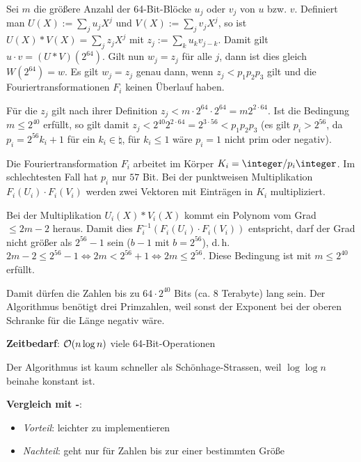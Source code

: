 \begin{Beweis}
    Sei $m$ die größere Anzahl der 64-Bit-Blöcke $u_j$ oder $v_j$ von $u$ bzw. $v$.
    Definiert man $U(X) := \sum_j u_j X^j$ und $V(X) := \sum_j v_j X^j$, so ist
    $U(X) \ast V(X) = \sum_j z_j X^j$ mit $z_j := \sum_k u_k v_{j-k}$.
    Damit gilt $u \cdot v = (U \ast V)(2^{64})$.
    Gilt nun $w_j = z_j$ für alle $j$, dann ist dies gleich $W(2^{64}) = w$.
    Es gilt $w_j = z_j$ genau dann, wenn $z_j < p_1 p_2 p_3$ gilt
    und die Fouriertransformationen $F_i$
    keinen Überlauf haben.

    Für die $z_j$ gilt nach ihrer Definition
    $z_j < m \cdot 2^{64} \cdot 2^{64} = m 2^{2 \cdot 64}$.
    Ist die Bedingung $m \le 2^{40}$ erfüllt, so gilt damit
    $z_j < 2^{40} 2^{2 \cdot 64} = 2^{3 \cdot 56} < p_1 p_2 p_3$
    (es gilt $p_i > 2^{56}$, da $p_i = 2^{56} k_i + 1$ für ein $k_i \in \natural$,
    für $k_i \le 1$ wäre $p_i = 1$ nicht prim oder negativ).

    Die Fouriertransformation $F_i$ arbeitet im Körper $K_i = \integer/p_i\integer$.
    Im schlechtesten Fall hat $p_i$ nur $57$ Bit.
    Bei der punktweisen Multiplikation $F_i(U_i) \cdot F_i(V_i)$ werden zwei Vektoren
    mit Einträgen in $K_i$ multipliziert.

    Bei der Multiplikation $U_i(X) \ast V_i(X)$ kommt ein Polynom vom Grad $\le 2m - 2$ heraus.
    Damit dies $F_i^{-1}(F_i(U_i) \cdot F_i(V_i))$ entspricht, darf der Grad nicht größer als
    $2^{56} - 1$ sein ($b - 1$ mit $b = 2^{56}$),
    d.\,h. $2m - 2 \le 2^{56} - 1 \iff 2m < 2^{56} + 1 \iff 2m \le 2^{56}$.
    Diese Bedingung ist mit $m \le 2^{40}$ erfüllt.
\end{Beweis}

Damit dürfen die Zahlen bis zu $64 \cdot 2^{40}$ Bits (ca. $8$ Terabyte) lang sein.
Der Algorithmus benötigt drei Primzahlen, weil sonst der Exponent bei der oberen Schranke für
die Länge negativ wäre.

\textbf{Zeitbedarf}:
$\mathcal{O}(n \log n)$ viele 64-Bit-Operationen

Der Algorithmus ist kaum schneller als Schönhage-Strassen, weil $\log \log n$ beinahe
konstant ist.

\linie

\textbf{Vergleich mit -}:
\begin{itemize}
    \item
    \emph{Vorteil}:
    leichter zu implementieren

    \item
    \emph{Nachteil}:
    geht nur für Zahlen bis zur einer bestimmten Größe
\end{itemize}

\pagebreak

